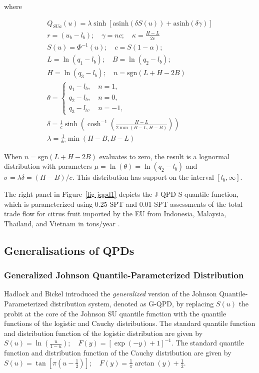 \documentclass[
  fleqn,
  deca,
  blindrev
]{informs4}
\begin{document}
where

\[
\begin{gathered}
Q_{SUa}(u) = \lambda\sinh\left[\text{asinh}(\delta S(u)) + \text{asinh}(\delta\gamma)\right]\\
r=(u_b-l_b); \quad \gamma=nc; \quad \kappa=\frac{H-L}{2c}\\
S(u)=\Phi^{-1}(u); \quad c=S(1-\alpha);\\
L=\ln(q_1-l_b); \quad  B=\ln(q_2-l_b);\\
H=\ln(q_3-l_b); \quad n=\text{sgn}(L+H-2B)\\
\theta=\begin{cases}
q_1-l_b, \quad n=1,\\
q_2-l_b, \quad n=0,\\
q_3-l_b, \quad n=-1,\end{cases}\\
\delta=\frac{1}{c}\sinh\left(\cosh^{-1}\left(\frac{H-L}{2\min(B-L,H-B)}\right)\right)\\
\lambda=\frac{1}{\delta c}\min(H-B, B-L)
\end{gathered}
\]

When \(n=\text{sgn}(L+H-2B)\) evaluates to zero, the result is a
lognormal distribution with parameters \(\mu=\ln(\theta)=\ln(q_2-l_b)\)
and \(\sigma=\lambda\delta=(H-B)/c\). This distribution has support on
the interval \([l_b,\infty]\).

The right panel in Figure~\ref{fig-jqpd1} depicts the J-QPD-S quantile
function, which is parameterized using 0.25-SPT and 0.01-SPT assessments
of the total trade flow for citrus fruit imported by the EU from
Indonesia, Malaysia, Thailand, and Vietnam in tons/year
\citep{efsa2023RiskAssessmentCitripestis}.

\subsection{Generalisations of QPDs}\label{generalisations-of-qpds}

\subsubsection{Generalized Johnson Quantile-Parameterized
Distribution}\label{generalized-johnson-quantile-parameterized-distribution}

Hadlock and Bickel
\citep{hadlock2019GeneralizedJohnsonQuantileParameterized} introduced
the \emph{generalized} version of the Johnson Quantile-Parameterized
distribution system, denoted as G-QPD, by replacing \(S(u)\) the probit
at the core of the Johnson SU quantile function with the quantile
functions of the logistic and Cauchy distributions. The standard
quantile function and distribution function of the logistic distribution
are given by
\(S(u)= \ln\left(\frac{u}{1-u}\right); \quad F(y)=[\exp(-y)+1]^{-1}\).
The standard quantile function and distribution function of the Cauchy
distribution are given by
\(S(u)= \tan\left[\pi\left(u-\frac{1}{2}\right)\right];\quad F(y)=\frac{1}{ \pi}\arctan(y)+\frac{1}{2}\).
\end{document}
